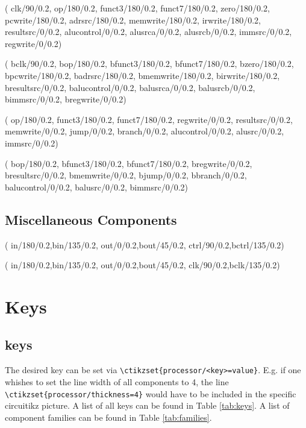\documentclass[.52pt,a4paper,titlepage]{article}
\begin{document}
(
clk/90/0.2,
op/180/0.2,
funct3/180/0.2,
funct7/180/0.2,
zero/180/0.2,
pcwrite/180/0.2,
adrsrc/180/0.2,
memwrite/180/0.2,
irwrite/180/0.2,
resultsrc/0/0.2,
alucontrol/0/0.2,
alusrca/0/0.2,
alusrcb/0/0.2,
immsrc/0/0.2,
regwrite/0/0.2)

(
bclk/90/0.2,
bop/180/0.2,
bfunct3/180/0.2,
bfunct7/180/0.2,
bzero/180/0.2,
bpcwrite/180/0.2,
badrsrc/180/0.2,
bmemwrite/180/0.2,
birwrite/180/0.2,
bresultsrc/0/0.2,
balucontrol/0/0.2,
balusrca/0/0.2,
balusrcb/0/0.2,
bimmsrc/0/0.2,
bregwrite/0/0.2)

(
op/180/0.2,
funct3/180/0.2,
funct7/180/0.2,
regwrite/0/0.2,
resultsrc/0/0.2,
memwrite/0/0.2,
jump/0/0.2,
branch/0/0.2,
alucontrol/0/0.2,
alusrc/0/0.2,
immsrc/0/0.2)

(
bop/180/0.2,
bfunct3/180/0.2,
bfunct7/180/0.2,
bregwrite/0/0.2,
bresultsrc/0/0.2,
bmemwrite/0/0.2,
bjump/0/0.2,
bbranch/0/0.2,
balucontrol/0/0.2,
balusrc/0/0.2,
bimmsrc/0/0.2)

\subsection{Miscellaneous Components}
(
in/180/0.2,bin/135/0.2,
out/0/0.2,bout/45/0.2,
ctrl/90/0.2,bctrl/135/0.2)

(
in/180/0.2,bin/135/0.2,
out/0/0.2,bout/45/0.2,
clk/90/0.2,bclk/135/0.2)


\section{Keys}
\subsection{\Circuitikz{} keys}
The desired \Circuitikz{} key can be set via \verb|\ctikzset{processor/<key>=value}|. E.g. if one whishes to set the line width of all components to 4, the line  \verb|\ctikzset{processor/thickness=4}| would have to be included in the specific circuitikz picture. A list of all \Circuitikz{} keys can be found in Table \ref{tab:keys}. A list of component families can be found in Table \ref{tab:families}.
\end{document}
